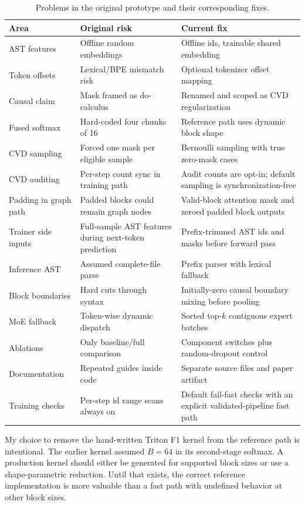\documentclass[10pt]{article}
\begin{document}
\begin{table}[t]
  \centering
  \caption{Problems in the original prototype and their corresponding fixes.}
  \label{tab:fixes}
  \small
  \begin{tabularx}{\textwidth}{@{}lYY@{}}
    \toprule
    Area & Original risk & Current fix \\
    \midrule
    AST features & Offline random embeddings & Offline ids, trainable shared embedding \\
    Token offsets & Lexical/BPE mismatch risk & Optional tokenizer offset mapping \\
    Causal claim & Mask framed as do-calculus & Renamed and scoped as CVD regularization \\
    Fused softmax & Hard-coded four chunks of 16 & Reference path uses dynamic block shape \\
    CVD sampling & Forced one mask per eligible sample & Bernoulli sampling with true zero-mask cases \\
    CVD auditing & Per-step count sync in training path & Audit counts are opt-in; default sampling is synchronization-free \\
    Padding in graph path & Padded blocks could remain graph nodes & Valid-block attention mask and zeroed padded block outputs \\
    Trainer side inputs & Full-sample AST features during next-token prediction & Prefix-trimmed AST ids and masks before forward pass \\
    Inference AST & Assumed complete-file parse & Prefix parser with lexical fallback \\
    Block boundaries & Hard cuts through syntax & Initially-zero causal boundary mixing before pooling \\
    MoE fallback & Token-wise dynamic dispatch & Sorted top-$k$ contiguous expert batches \\
    Ablations & Only baseline/full comparison & Component switches plus random-dropout control \\
    Documentation & Repeated guides inside code & Separate source files and paper artifact \\
    Training checks & Per-step id range scans always on & Default fail-fast checks with an explicit validated-pipeline fast path \\
    \bottomrule
  \end{tabularx}
\end{table}

My choice to remove the hand-written Triton F1 kernel from the reference path is
intentional.  The earlier kernel assumed $B=64$ in its second-stage softmax.  A
production kernel should either be generated for supported block sizes or use a
shape-parametric reduction.  Until that exists, the correct reference
implementation is more valuable than a fast path with undefined behavior at
other block sizes.
\end{document}
